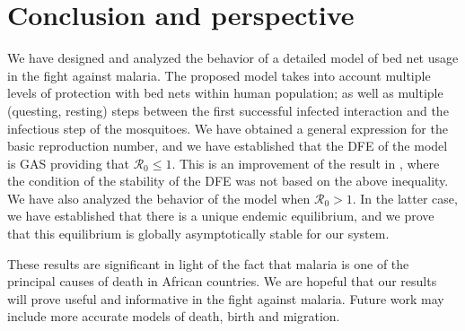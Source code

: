 \documentclass[a4paper]{article}
\begin{document}
\section{Conclusion and perspective}
We have designed and analyzed the behavior of a detailed model of bed net usage in the fight against malaria. The proposed model takes into account multiple levels of protection with bed nets within human population; as well as multiple (questing, resting) steps between the first successful infected interaction and the infectious step of the mosquitoes.   We have obtained a general expression for the basic reproduction number, and we have  established that the DFE of the model is GAS providing that $\mathcal R_0\leqslant 1$. This is an improvement of the result  in \cite{MR2168743}, where the condition of the stability of the DFE was not based on the above inequality. We have also analyzed the behavior of the model when $\mathcal R_0>1$. In the latter case, we have established that there  is a unique endemic equilibrium, and we prove that this equilibrium is globally asymptotically stable for our system. 

These results are significant in light of the fact that malaria is one of the principal causes of death in African countries. We are hopeful that our results will prove useful and informative in the fight against malaria. Future work may include more accurate models of  death, birth and migration. 
\end{document}
